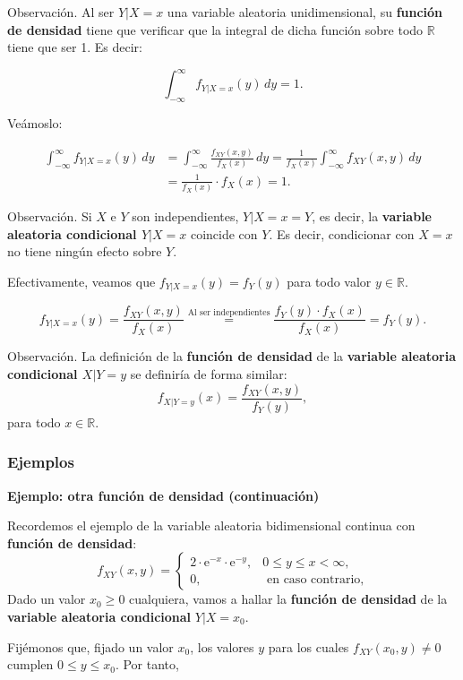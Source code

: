\documentclass[
  letterpaper,
  DIV=11,
  numbers=noendperiod]{scrreprt}
\begin{document}
Observación. Al ser \(Y|X=x\) una variable aleatoria unidimensional, su
\textbf{función de densidad} tiene que verificar que la integral de
dicha función sobre todo \(\mathbb{R}\) tiene que ser 1. Es decir:

\[
\int_{-\infty}^\infty f_{Y|X=x}(y)\, dy=1.
\]

Veámoslo:

\[
\begin{array}{rl}
\int_{-\infty}^\infty f_{Y|X=x}(y)\, dy & =\int_{-\infty}^\infty \frac{f_{XY}(x,y)}{f_X(x)}\, dy=\frac{1}{f_X(x)}\int_{-\infty}^\infty f_{XY}(x,y)\, dy\\
& = \frac{1}{f_X(x)}\cdot f_X(x) =1.
\end{array}
\]

Observación. Si \(X\) e \(Y\) son independientes, \(Y|X=x =Y\), es
decir, la \textbf{variable aleatoria condicional \(Y|X=x\)} coincide con
\(Y\). Es decir, condicionar con \(X=x\) no tiene ningún efecto sobre
\(Y\).

Efectivamente, veamos que \(f_{Y|X=x}(y)=f_Y(y)\) para todo valor
\(y\in\mathbb{R}.\)

\[
f_{Y|X=x}(y) =\displaystyle \frac{f_{XY}(x,y)}{f_X(x)} \stackrel{\mbox{Al ser independientes}}{=}\frac{f_Y(y)\cdot f_X(x)}{f_X(x)}=f_Y(y).
\]

Observación. La definición de la \textbf{función de densidad} de la
\textbf{variable aleatoria condicional \(X|Y=y\)} se definiría de forma
similar: \[
f_{X|Y=y}(x)=\frac{f_{XY}(x,y)}{f_Y(y)},
\] para todo \(x\in\mathbb{R}\).

\hypertarget{ejemplos-7}{%
\subsubsection{Ejemplos}\label{ejemplos-7}}

\textbf{Ejemplo: otra función de densidad (continuación)}

Recordemos el ejemplo de la variable aleatoria bidimensional continua
con \textbf{función de densidad}: \[
f_{XY}(x,y)=\begin{cases}
2 \cdot \mathrm{e}^{-x}\cdot \mathrm{e}^{-y}, & 0\leq y\leq x < \infty,\\
0, & \mbox{ en caso contrario,}
\end{cases}
\] Dado un valor \(x_0\geq 0\) cualquiera, vamos a hallar la
\textbf{función de densidad} de la \textbf{variable aleatoria
condicional} \(Y|X=x_0\).

Fijémonos que, fijado un valor \(x_0\), los valores \(y\) para los
cuales \(f_{XY}(x_0,y)\neq 0\) cumplen \(0\leq y\leq x_0\). Por tanto,
\end{document}
